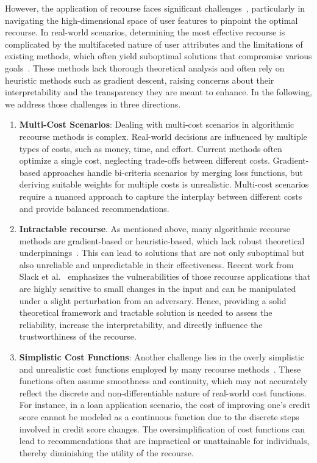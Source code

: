 However, the application of recourse faces significant challenges~\cite{karimi2020survey}, particularly in navigating the high-dimensional space of user features to pinpoint the optimal recourse. In real-world scenarios, determining the most effective recourse is complicated by the multifaceted nature of user attributes and the limitations of existing methods, which often yield suboptimal solutions that compromise various goals~\cite{ustun2019actionable}. These methods lack thorough theoretical analysis and often rely on heuristic methods such as gradient descent, raising concerns about their interpretability and the transparency they are meant to enhance. In the following, we address those challenges in three directions.

\begin{enumerate}
\item \textbf{Multi-Cost Scenarios}: Dealing with multi-cost scenarios in algorithmic recourse methods is complex. Real-world decisions are influenced by multiple types of costs, such as money, time, and effort. Current methods often optimize a single cost, neglecting trade-offs between different costs. Gradient-based approaches handle bi-criteria scenarios by merging loss functions, but deriving suitable weights for multiple costs is unrealistic. Multi-cost scenarios require a nuanced approach to capture the interplay between different costs and provide balanced recommendations.

\item \textbf{Intractable recourse}. As mentioned above, many algorithmic recourse methods are gradient-based or heuristic-based, which lack robust theoretical underpinnings~\cite{karimi2020algorithmic}. This can lead to solutions that are not only suboptimal but also unreliable and unpredictable in their effectiveness. Recent work from Slack et al.~\cite{slack2021counterfactual} emphasizes the vulnerabilities of those recourse applications that are highly sensitive to small changes in the input and can be manipulated under a slight perturbation from an adversary. Hence, providing a solid theoretical framework and tractable solution is needed to assess the reliability, increase the interpretability, and directly influence the trustworthiness of the recourse.

\item \textbf{Simplistic Cost Functions}: Another challenge lies in the overly simplistic and unrealistic cost functions employed by many recourse methods~\cite{chereda2021explaining,dwork2012fairness,verma2020counterfactual}. These functions often assume smoothness and continuity, which may not accurately reflect the discrete and non-differentiable nature of real-world cost functions. For instance, in a loan application scenario, the cost of improving one's credit score cannot be modeled as a continuous function due to the discrete steps involved in credit score changes. The oversimplification of cost functions can lead to recommendations that are impractical or unattainable for individuals, thereby diminishing the utility of the recourse.
\end{enumerate}


